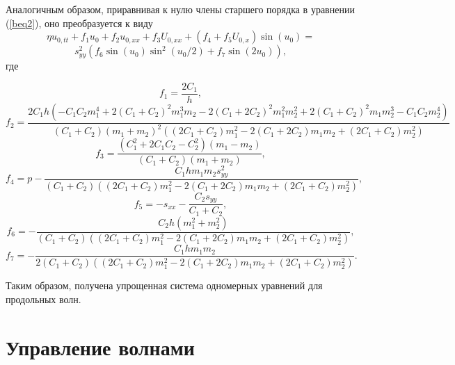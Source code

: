 Аналогичным образом, приравнивая к нулю члены старшего порядка в уравнении (\ref {beq2}), оно преобразуется к виду
\[
\eta u_{0,tt}+f_1 u_0+f_2 u_{0,xx}+f_3 U_{0,xx}+(f_4+f_5 U_{0,x})\sin(u_0)=
\]
\begin{equation}
	s_{yy}^2 (f_6 \sin(u_0) \sin^2(u_0/2)+f_7 \sin(2 u_0)), \label{goveq2}
\end{equation}
где
\begin{small}
\[
f_1=\frac{2 C_1}{h},
\]
\[
f_2=\frac{2 C_1 h (-C_1 C_2 m_1^4 + 2 (C_1 + C_2)^2 m_1^3 m_2 - 
	2 (C_1 + 2 C_2)^2 m_1^2 m_2^2 + 2 (C_1 + C_2)^2 m_1 m_2^3 - 
	C_1 C_2 m_2^4)}{(C_1 + C_2) (m_1 + m_2)^2 ((2 C_1 + C_2) m_1^2 - 
	2 (C_1 + 2 C_2) m_1 m_2 + (2 C_1 + C_2) m_2^2)}
\]
\[
f_3=\frac{(C_1^2 + 2 C_1 C_2 - C_2^2) (m_1 - m_2)}{(C_1 + C_2) (m_1 + m_2)},
\]
\[
f_4=p - \frac{C_1 h m_1 m_2 s_{yy}^2}{(C_1 + C_2) ((2 C_1 + C_2) m_1^2 - 
	2 (C_1 + 2 C_2) m_1 m_2 + (2 C_1 + C_2) m_2^2)},
\]
\[
f_5=- s_{xx} - \frac{C_2 s_{yy}}{C_1 + C_2},
\]
\[
f_6=-\frac{C_2 h (m_1^2 + m_2^2)}{(C_1 + C_2) ((2 C_1 + C_2) m_1^2 - 
	2 (C_1 + 2 C_2) m_1 m_2 + (2 C_1 + C_2) m_2^2)},
\]
\[
f_7=-\frac{C_1 h m_1 m_2 }{2(C_1 + C_2) ((2 C_1 + C_2) m_1^2 - 
	2 (C_1 + 2 C_2) m_1 m_2 + (2 C_1 + C_2) m_2^2)}.
\]
\end{small}
Таким образом, получена упрощенная система одномерных уравнений для продольных волн.

\section{Управление волнами}

